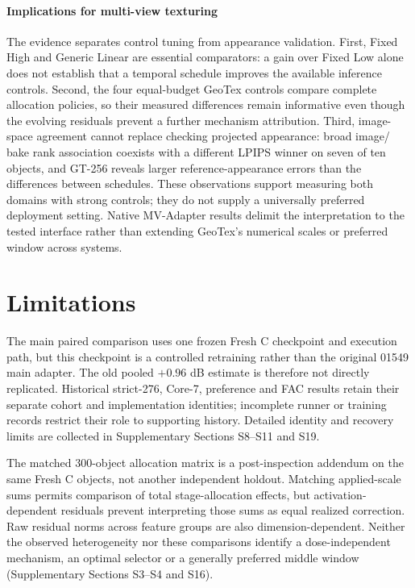 \documentclass[times,twocolumn,final]{elsarticle}
\providecommand{\DIFadd}[1]{{\protect\color{blue} \sf #1}} %
\providecommand{\DIFaddbegin}{} %
\providecommand{\DIFaddend}{} %
\providecommand{\DIFaddFL}[1]{\DIFadd{#1}} %
\providecommand{\DIFaddbeginFL}{\DIFaddbegin} %
\providecommand{\DIFaddendFL}{\DIFaddend} %
\renewcommand{\DIFaddbeginFL}{}
\renewcommand{\DIFaddendFL}{}
\renewcommand{\DIFaddFL}[1]{#1}
\begin{document}
  \DIFaddbeginFL \paragraph{Implications for multi-view texturing}
\DIFaddFL{The evidence separates control tuning from appearance validation. First, Fixed High and Generic Linear are essential comparators: a gain over Fixed Low alone does not establish that a temporal schedule improves the available inference controls. Second, the four equal-budget GeoTex controls compare complete allocation policies, so their measured differences remain informative even though the evolving residuals prevent a further mechanism attribution. Third, image-space agreement cannot replace checking projected appearance: broad image}\DIFaddendFL /  \DIFaddbegin \DIFadd{bake rank association coexists with a different LPIPS winner on seven of ten objects, and GT-256 reveals larger reference-appearance errors than the differences between schedules. These observations support measuring both domains with strong controls; they do not supply a universally preferred deployment setting. Native MV-Adapter results delimit the interpretation to the tested interface rather than extending GeoTex's numerical scales or preferred window across systems.
}\DIFaddend 

\section{Limitations}
\label{sec:limitations}

  \DIFaddbegin \DIFadd{The main paired comparison uses one frozen Fresh C checkpoint and execution path, but this checkpoint is a controlled retraining rather than the original 01549 main adapter. The old pooled $+0.96$ dB estimate is therefore not directly replicated. Historical strict-276, Core-7, preference and FAC results retain their separate cohort and implementation identities; incomplete runner or training records restrict their role to supporting history. Detailed identity and recovery limits are collected in Supplementary Sections S8--S11 }\DIFaddend and  
 \DIFaddbegin \DIFadd{S19.
}\DIFaddend 

  \DIFaddbegin \DIFadd{The matched 300-object allocation matrix is }\DIFaddend a   \DIFaddbegin \DIFadd{post-inspection addendum on the same Fresh C objects, not another independent holdout. Matching applied-scale sums permits comparison of total stage-allocation effects, but activation-dependent residuals prevent interpreting those sums as equal realized correction. Raw residual norms across feature groups are also dimension-dependent. Neither the observed heterogeneity nor these comparisons identify a dose-independent mechanism, an optimal selector or a generally preferred middle window (Supplementary Sections S3--S4 and S16).
}
\end{document}
